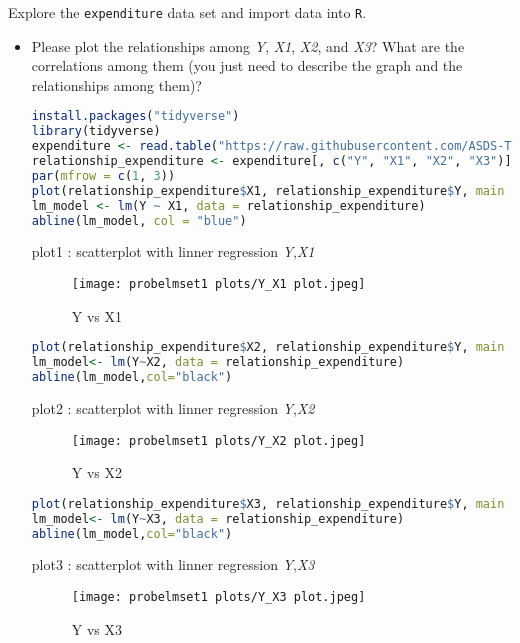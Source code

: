 \documentclass[12pt,letterpaper]{article}
\begin{document}
\vspace{.5cm}
\noindent Explore the \texttt{expenditure} data set and import data into \texttt{R}.
\vspace{.5cm}
  
\vspace{.5cm}
\begin{itemize}

\item
Please plot the relationships among \emph{Y}, \emph{X1}, \emph{X2}, and \emph{X3}? What are the correlations among them (you just need to describe the graph and the relationships among them)?
\begin{lstlisting}[language=R]
install.packages("tidyverse") 
library(tidyverse) 
expenditure <- read.table("https://raw.githubusercontent.com/ASDS-TCD/StatsI_Fall2023/main/datasets/expenditure.txt", header=T)
relationship_expenditure <- expenditure[, c("Y", "X1", "X2", "X3")]
par(mfrow = c(1, 3))  
plot(relationship_expenditure$X1, relationship_expenditure$Y, main = "Y vs. X1", xlab = "X1", ylab = "Y", col = "yellow")
lm_model <- lm(Y ~ X1, data = relationship_expenditure)
abline(lm_model, col = "blue")
\end{lstlisting}
plot1 : scatterplot with linner regression \emph{Y},\emph{X1}
\begin{figure}[htp]
    \centering
    \texttt{[image: probelmset1 plots/Y\_X1 plot.jpeg]}
    \caption{Y vs X1 }
    \label{Y_X1 plot}
\end{figure}

\begin{lstlisting}[language=R]
plot(relationship_expenditure$X2, relationship_expenditure$Y, main = "Y vs. X2", xlab = "X2", ylab = "Y", col = "pink")
lm_model<- lm(Y~X2, data = relationship_expenditure)
abline(lm_model,col="black")
\end{lstlisting}

plot2 : scatterplot with linner regression \emph{Y},\emph{X2}

\begin{figure}[htp]
    \centering
    \texttt{[image: probelmset1 plots/Y\_X2 plot.jpeg]}
    \caption{Y vs X2 }
    \label{Y_X2 plot}
\end{figure}

\begin{lstlisting}[language=R]
plot(relationship_expenditure$X3, relationship_expenditure$Y, main = "Y vs. X3", xlab = "X3", ylab = "Y", col = "blue")
lm_model<- lm(Y~X3, data = relationship_expenditure)
abline(lm_model,col="black")
\end{lstlisting}
plot3 : scatterplot with linner regression \emph{Y},\emph{X3}
\begin{figure}[htp]
    \centering
    \texttt{[image: probelmset1 plots/Y\_X3 plot.jpeg]}
    \caption{Y vs X3 }
    \label{Y_X3 plot}
\end{figure}


\end{itemize}
\end{document}
